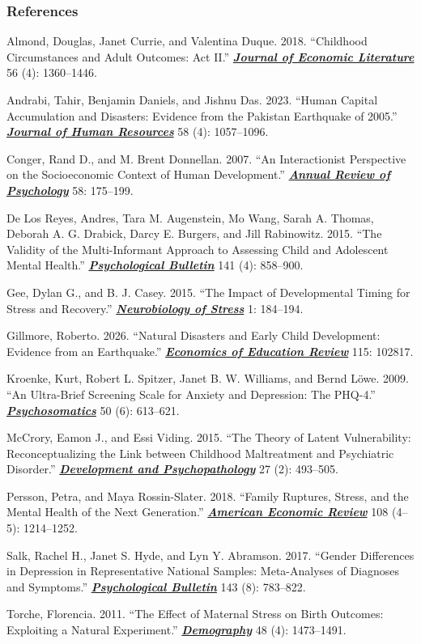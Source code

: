 \documentclass[aspectratio=169,11pt]{beamer}
\newcommand{\revista}[2]{\href{https://doi.org/#1}{{\bfseries\itshape #2}}}
\begin{document}
\begin{frame}[allowframebreaks,t]
\frametitle{References}
{\scriptsize\raggedright\setlength{\leftskip}{5mm}\setlength{\parindent}{-5mm}%
\setlength{\parskip}{1.6mm}%
Almond, Douglas, Janet Currie, and Valentina Duque. 2018. “Childhood
Circumstances and Adult Outcomes: Act II.” \revista{10.1257/jel.20171164}{Journal of Economic
Literature} 56 (4): 1360--1446.\par
Andrabi, Tahir, Benjamin Daniels, and Jishnu Das. 2023. “Human Capital
Accumulation and Disasters: Evidence from the Pakistan Earthquake of 2005.”
\revista{10.3368/jhr.59.2.0520-10887R1}{Journal of Human Resources} 58 (4): 1057--1096.\par
Conger, Rand D., and M. Brent Donnellan. 2007. “An Interactionist Perspective
on the Socioeconomic Context of Human Development.” \revista{10.1146/annurev.psych.58.110405.085551}{Annual Review of
Psychology} 58: 175--199.\par
De Los Reyes, Andres, Tara M. Augenstein, Mo Wang, Sarah A. Thomas, Deborah A. G.
Drabick, Darcy E. Burgers, and Jill Rabinowitz. 2015. “The Validity of the
Multi-Informant Approach to Assessing Child and Adolescent Mental Health.”
\revista{10.1037/a0038498}{Psychological Bulletin} 141 (4): 858--900.\par
Gee, Dylan G., and B. J. Casey. 2015. “The Impact of Developmental Timing for
Stress and Recovery.” \revista{10.1016/j.ynstr.2015.02.001}{Neurobiology of Stress} 1: 184--194.\par
Gillmore, Roberto. 2026. “Natural Disasters and Early Child Development:
Evidence from an Earthquake.” \revista{10.1016/j.econedurev.2026.102817}{Economics of Education Review} 115:
102817.\par
Kroenke, Kurt, Robert L. Spitzer, Janet B. W. Williams, and Bernd Löwe. 2009.
“An Ultra-Brief Screening Scale for Anxiety and Depression: The PHQ-4.”
\revista{10.1176/appi.psy.50.6.613}{Psychosomatics} 50 (6): 613--621.\par
McCrory, Eamon J., and Essi Viding. 2015. “The Theory of Latent
Vulnerability: Reconceptualizing the Link between Childhood Maltreatment and
Psychiatric Disorder.” \revista{10.1017/S0954579415000115}{Development and
Psychopathology} 27 (2): 493--505.\par
Persson, Petra, and Maya Rossin-Slater. 2018. “Family Ruptures, Stress, and
the Mental Health of the Next Generation.” \revista{10.1257/aer.20141406}{American Economic Review}
108 (4--5): 1214--1252.\par
Salk, Rachel H., Janet S. Hyde, and Lyn Y. Abramson. 2017. “Gender Differences
in Depression in Representative National Samples: Meta-Analyses of Diagnoses and
Symptoms.” \revista{10.1037/bul0000102}{Psychological Bulletin} 143 (8):
783--822.\par
Torche, Florencia. 2011. “The Effect of Maternal Stress on Birth Outcomes:
Exploiting a Natural Experiment.” \revista{10.1007/s13524-011-0054-z}{Demography} 48 (4): 1473--1491.\par}
\end{frame}
\end{document}
